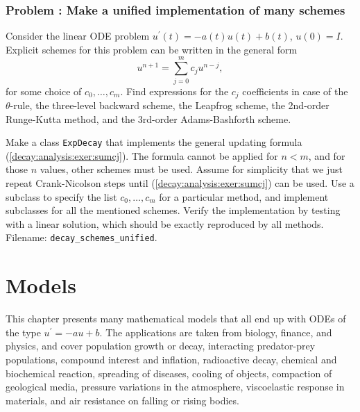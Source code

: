 \documentclass[graybox,sectrefs,envcountresetchap,open=right,final]{svmonodo}
\newenvironment{doconceexercise}{}{}
\newcounter{doconceexercisecounter}
\begin{document}
\begin{doconceexercise}

\subsection*{Problem \thedoconceexercisecounter: Make a unified implementation of many schemes}

\label{decay:fd2:exer:uni}

Consider the linear ODE problem $u^{\prime}(t)=-a(t)u(t) + b(t)$, $u(0)=I$.
Explicit schemes for this problem can be written in the general form
\begin{equation}
u^{n+1} = \sum_{j=0}^m c_ju^{n-j},
\label{decay:analysis:exer:sumcj}
\end{equation}
for some choice of $c_0,\ldots,c_m$.
Find expressions for the $c_j$ coefficients in case of the
$\theta$-rule, the three-level backward scheme,
the Leapfrog scheme, the 2nd-order Runge-Kutta method,
and the 3rd-order Adams-Bashforth scheme.

Make a class \texttt{ExpDecay} that implements the
general updating formula (\ref{decay:analysis:exer:sumcj}).
The formula cannot be applied for $n < m$, and for those $n$ values, other
schemes must be used. Assume for simplicity that we just
repeat Crank-Nicolson steps until (\ref{decay:analysis:exer:sumcj}) can be used.
Use a subclass
to specify the list $c_0,\ldots,c_m$ for a particular method, and
implement subclasses for all the mentioned schemes.
Verify the implementation by testing with a linear solution, which should
be exactly reproduced by all methods.
\noindent Filename: \Verb!decay_schemes_unified!.

\end{doconceexercise}


\chapter{Models}
\label{decay:app}

This chapter presents many mathematical models that all end up with
ODEs of the type $u^{\prime}=-au+b$.  The applications are taken from
biology, finance, and physics, and cover population growth or decay,
interacting predator-prey populations, compound interest and
inflation, radioactive decay, chemical and biochemical reaction,
spreading of diseases, cooling of objects, compaction of geological
media, pressure variations in the atmosphere, viscoelastic response in
materials, and air resistance on falling or rising bodies.
\end{document}
